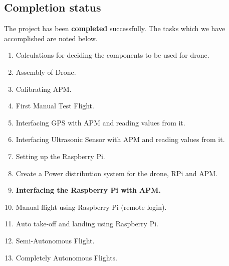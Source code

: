 \documentclass[a4paper,12pt,oneside]{book}
\begin{document}
\subsection*{Completion status}
The project has been \textbf{completed} successfully. The tasks which we have accomplished are noted below.
    \begin{enumerate}
        \item Calculations for deciding the components to be used for drone.
        \item Assembly of Drone.
        \item Calibrating APM.
        \item First Manual Test Flight.
        \item Interfacing GPS with APM and reading values from it.
        \item Interfacing Ultrasonic Sensor with APM and reading values from it.
        \item Setting up the Raspberry Pi.
        \item Create a Power distribution system for the drone, RPi and APM.
        \item \textbf{Interfacing the Raspberry Pi with APM.}
        \item Manual flight using Raspberry Pi (remote login).
        \item Auto take-off and landing using Raspberry Pi.
        \item Semi-Autonomous Flight.
        \item Completely Autonomous Flights.
    \end{enumerate}
\end{document}
